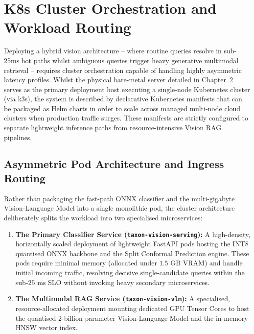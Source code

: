 \section{K8s Cluster Orchestration and Workload Routing}
\label{sec:k8s_orchestration}

Deploying a hybrid vision architecture -- where routine queries resolve in sub-25ms hot paths whilst ambiguous queries trigger heavy generative multimodal retrieval -- requires cluster orchestration capable of handling highly asymmetric latency profiles. Whilst the physical bare-metal server detailed in Chapter~2 serves as the primary deployment host executing a single-node Kubernetes cluster (via k3s), the system is described by declarative Kubernetes manifests that can be packaged as Helm charts in order to scale across managed multi-node cloud clusters when production traffic surges. These manifests are strictly configured to separate lightweight inference paths from resource-intensive Vision RAG pipelines.

\subsection{Asymmetric Pod Architecture and Ingress Routing}
Rather than packaging the fast-path ONNX classifier and the multi-gigabyte Vision-Language Model into a single monolithic pod, the cluster architecture deliberately splits the workload into two specialised microservices:
\begin{enumerate}
    \item \textbf{The Primary Classifier Service (\texttt{taxon-vision-serving}):} A high-density, horizontally scaled deployment of lightweight FastAPI pods hosting the INT8 quantised ONNX backbone and the Split Conformal Prediction engine. These pods require minimal memory (allocated under $1.5\text{ GB}$ VRAM) and handle initial incoming traffic, resolving decisive single-candidate queries within the sub-$25\text{ ms}$ SLO without invoking heavy secondary microservices.
    \item \textbf{The Multimodal RAG Service (\texttt{taxon-vision-vlm}):} A specialised, resource-allocated deployment mounting dedicated GPU Tensor Cores to host the quantised 2-billion parameter Vision-Language Model and the in-memory HNSW vector index.
\end{enumerate}

